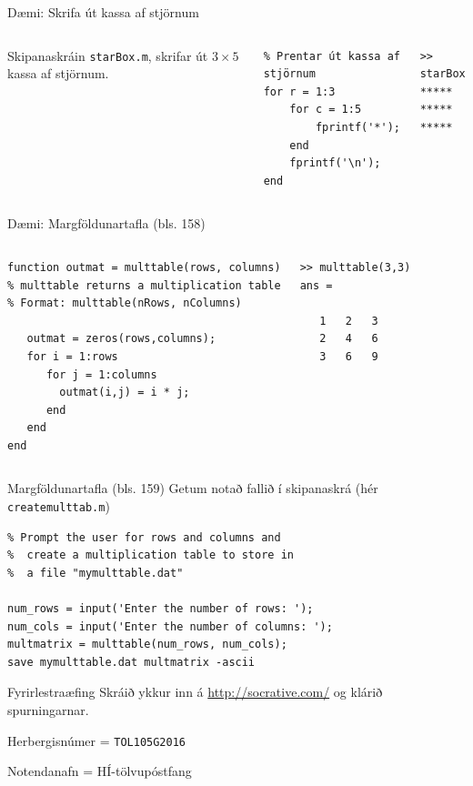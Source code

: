 \documentclass[handout]{beamer}
\begin{document}
\begin{frame}[fragile]{Dæmi: Skrifa út kassa af stjörnum}
\begin{columns}
Skipanaskráin \texttt{starBox.m}, skrifar út $3 \times 5$ kassa af stjörnum.
\begin{verbatim}
% Prentar út kassa af stjörnum
for r = 1:3
    for c = 1:5
        fprintf('*');
    end
    fprintf('\n');
end
\end{verbatim}
\begin{verbatim}
>> starBox
*****
*****
*****
\end{verbatim}
\end{columns}
\end{frame}

\begin{frame}[fragile]{Dæmi: Margföldunartafla (bls. 158)}
\begin{columns}
\begin{verbatim}
function outmat = multtable(rows, columns)
% multtable returns a multiplication table
% Format: multtable(nRows, nColumns)

   outmat = zeros(rows,columns);
   for i = 1:rows
      for j = 1:columns
        outmat(i,j) = i * j;
      end
   end
end
\end{verbatim}
\begin{verbatim}
>> multtable(3,3)
ans =

   1   2   3
   2   4   6
   3   6   9
\end{verbatim}
\end{columns}
\end{frame}

\begin{frame}[fragile]{Margföldunartafla (bls. 159)}
\vspace{\baselineskip}
Getum notað fallið í skipanaskrá (hér \texttt{createmulttab.m})
\begin{verbatim}
% Prompt the user for rows and columns and
%  create a multiplication table to store in
%  a file "mymulttable.dat"
 
num_rows = input('Enter the number of rows: ');
num_cols = input('Enter the number of columns: ');
multmatrix = multtable(num_rows, num_cols);
save mymulttable.dat multmatrix -ascii
\end{verbatim}
\end{frame}

\begin{frame}[fragile]{Fyrirlestraæfing}
Skráið ykkur inn á \url{http://socrative.com/} og klárið spurningarnar.

Herbergisnúmer = \texttt{TOL105G2016}

Notendanafn = HÍ-tölvupóstfang
\end{frame}
\end{document}
